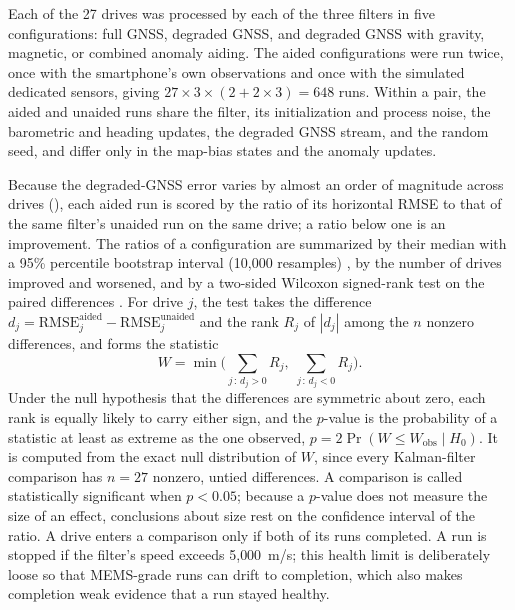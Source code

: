 Each of the 27 drives was processed by each of the three filters in five configurations: full GNSS, degraded GNSS, and degraded GNSS with gravity, magnetic, or combined anomaly aiding. The aided configurations were run twice, once with the smartphone's own observations and once with the simulated dedicated sensors, giving \(27 \times 3 \times (2 + 2 \times 3) = 648\) runs. Within a pair, the aided and unaided runs share the filter, its initialization and process noise, the barometric and heading updates, the degraded GNSS stream, and the random seed, and differ only in the map-bias states and the anomaly updates.

Because the degraded-GNSS error varies by almost an order of magnitude across drives (), each aided run is scored by the ratio of its horizontal RMSE to that of the same filter's unaided run on the same drive; a ratio below one is an improvement. The ratios of a configuration are summarized by their median with a 95\% percentile bootstrap interval (10{,}000 resamples) \citep{efron1993bootstrap}, by the number of drives improved and worsened, and by a two-sided Wilcoxon signed-rank test on the paired differences \citep{wilcoxon1945individual}.
For drive \(j\), the test takes the difference \(d_j = \mathrm{RMSE}_j^\mathrm{aided} - \mathrm{RMSE}_j^\mathrm{unaided}\) and the rank \(R_j\) of \(|d_j|\) among the \(n\) nonzero differences, and forms the statistic \begin{equation}
  W = \min\Bigg( \sum_{j \,:\, d_j > 0} R_j, \; \sum_{j \,:\, d_j < 0} R_j \Bigg).
  \label{eqn:wilcoxon}
\end{equation} Under the null hypothesis that the differences are symmetric about zero, each rank is equally likely to carry either sign, and the \(p\)-value is the probability of a statistic at least as extreme as the one observed, \(p = 2 \Pr(W \leq W_\mathrm{obs} \mid H_0)\).
It is computed from the exact null distribution of \(W\), since every Kalman-filter comparison has \(n = 27\) nonzero, untied differences.
A comparison is called statistically significant when \(p < 0.05\); because a \(p\)-value does not measure the size of an effect, conclusions about size rest on the confidence interval of the ratio. A drive enters a comparison only if both of its runs completed. A run is stopped if the filter's speed exceeds 5{,}000~m/s; this health limit is deliberately loose so that MEMS-grade runs can drift to completion, which also makes completion weak evidence that a run stayed healthy.

